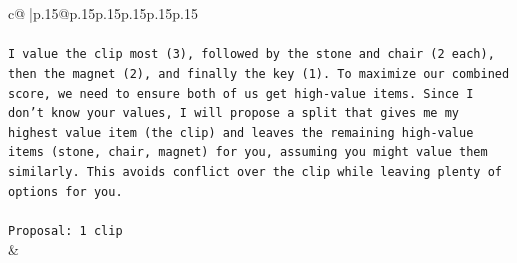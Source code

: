 \documentclass{article}
\begin{document}
{\begin{supertabular}{c@{$\;$}|p{.15\linewidth}@{}p{.15\linewidth}p{.15\linewidth}p{.15\linewidth}p{.15\linewidth}p{.15\linewidth}}
{{{\\ 
\\ 
\texttt{I value the clip most (3), followed by the stone and chair (2 each), then the magnet (2), and finally the key (1). To maximize our combined score, we need to ensure both of us get high{-}value items. Since I don't know your values, I will propose a split that gives me my highest value item (the clip) and leaves the remaining high{-}value items (stone, chair, magnet) for you, assuming you might value them similarly. This avoids conflict over the clip while leaving plenty of options for you.} \\
\\ 
\texttt{Proposal: 1 clip} \\
            }
        }
    }
    & \\ \\


\end{supertabular}}
\end{document}
